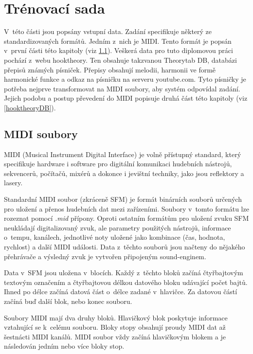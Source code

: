 \chapter{Trénovací sada}
V~této části jsou popsány vstupní data.
Zadání specifikuje některý ze standardizovaných formátů.
Jedním z~nich je MIDI.
Tento formát je popsán v~první části této kapitoly (viz \ref{midisoubory}).
Veškerá data pro tuto diplomovou práci pochází z~webu hooktheory.
Ten obsahuje takzvanou Theorytab DB, databázi přepisů známých písniček.
Přepisy obsahují melodii, harmonii ve formě harmonické funkce 
a odkaz na písničku na serveru youtube.com.
Tyto písničky je potřeba nejprve transformovat na MIDI soubory,
aby systém odpovídal zadání.
Jejich podobu a postup převedení do MIDI popisuje druhá část této kapitoly (viz \ref{hooktheoryDB}).

\section{MIDI soubory}
\label{midisoubory}
MIDI (Musical Instrument Digital Interface) je volně přístupný standard,
který specifikuje hardware i software 
pro digitální komunikaci hudebních nástrojů,
sekvencerů, počítačů, mixérů 
a dokonce i jevištní techniky, jako jsou reflektory a lasery.
\cite{MIDI_tutorials}
\par

Standardní MIDI soubor (zkráceně SFM) je formát binárních souborů 
určených pro uložení a přenos hudebních dat mezi zařízeními.
Soubory v~tomto formátu lze rozeznat pomocí \emph{.mid} přípony.
Oproti ostatním formátům pro uložení zvuku 
SFM neukládají digitalizovaný zvuk,
ale parametry použitých nástrojů, informace o~tempu, kanálech, 
jednotlivé noty uložené jako kombinace (čas, hodnota, rychlost) 
a další MIDI události.
Data z~těchto souborů jsou načteny do nějakého přehrávače 
a výsledný zvuk je vytvořen připojeným sound-enginem.
\cite{MIDI_tutorials,Neznamy_aboutMIDIFiles}
\par

Data v~SFM jsou uložena v~blocích.
Každý z~těchto bloků začíná čtyřbajtovým textovým označením 
a čtyřbajtovou délkou datového bloku udávající počet bajtů.
Ihned po délce začíná datová část o~délce zadané v~hlavičce.
Za datovou částí začíná buď další blok, nebo konec souboru.
\cite{MIDI_tutorials,Back_SMF_Specif}
\par

Soubory MIDI mají dva druhy bloků. 
Hlavičkový blok poskytuje informace vztahující se k~celému souboru.
Bloky stopy obsahují proudy MIDI dat až šestnácti MIDI kanálů.
MIDI soubor vždy začíná hlavičkovým blokem 
a je následován jedním nebo více bloky stop.\cite{Back_SMF_Specif}

